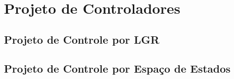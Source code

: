 \chapter{Projeto de Controladores}


\section{Projeto de Controle por LGR}


\section{Projeto de Controle por Espaço de Estados}


